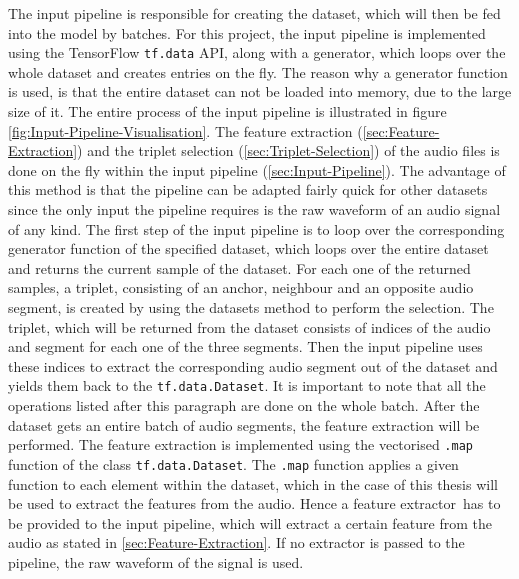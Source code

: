 \noindent
The input pipeline is responsible for creating the dataset, which will then be fed into the model by batches. For this project, the input pipeline is implemented using the TensorFlow \texttt{tf.data} API\footnotemark, along with a generator, which loops over the whole dataset and creates entries on the fly. The reason why a generator function is used, is that the entire dataset can not be loaded into memory, due to the large size of it. The entire process of the input pipeline is illustrated in figure \ref{fig:Input-Pipeline-Visualisation}.
\newline
\newline
The feature extraction (\ref{sec:Feature-Extraction}) and the triplet selection (\ref{sec:Triplet-Selection}) of the audio files is done on the fly within the input pipeline (\ref{sec:Input-Pipeline}). The advantage of this method is that the pipeline can be adapted fairly quick for other datasets since the only input the pipeline requires is the raw waveform of an audio signal of any kind. 
\newline
\newline
The first step of the input pipeline is to loop over the corresponding generator function of the specified dataset, which loops over the entire dataset and returns the current sample of the dataset. For each one of the returned samples, a triplet, consisting of an anchor, neighbour and an opposite audio segment, is created by using the datasets method to perform the selection. The triplet, which will be returned from the dataset consists of indices of the audio and segment for each one of the three segments. Then the input pipeline uses these indices to extract the corresponding audio segment out of the dataset and yields them back to the \texttt{tf.data.Dataset}. It is important to note that all the operations listed after this paragraph are done on the whole batch.
\newline
\newline
After the dataset gets an entire batch of audio segments, the feature extraction will be performed. The feature extraction is implemented using the vectorised \texttt{.map} function of the class \texttt{tf.data.Dataset}\footnotemark. The \texttt{.map} function applies a given function to each element within the dataset, which in the case of this thesis will be used to extract the features from the audio. Hence a \flqq feature extractor\frqq \ has to be provided to the input pipeline, which will extract a certain feature from the audio as stated in \ref{sec:Feature-Extraction}. If no extractor is passed to the pipeline, the raw waveform of the signal is used. 
